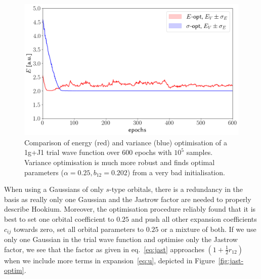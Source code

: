 \documentclass[final,3p,times,twocolumn]{elsarticle}
\begin{document}
	\afterpage{\FloatBarrier}
	\noindent
	\begin{figure}[h]
		\centering
		\includegraphics[width=\linewidth]{../plots/vmc-opt-1g.png}
		\caption{Comparison of energy (red) and variance (blue) optimisation of a 1g+J1 trial wave function over 600 epochs with $10^5$ samples. Variance optimisation is much more robust and finds optimal parameters ($\alpha = 0.25, b_{12} = 0.202$) from a very bad initialisation.}
		\label{fig:basic-optim}
	\end{figure}

	When using a Gaussians of only $s$-type orbitals, there is a redundancy in the basis as really only one Gaussian and the Jastrow factor are needed to properly describe Hookium. Moreover, the optimisation procedure reliably found that it is best to set one orbital coefficient to $0.25$ and push all other expansion coefficients $c_{ij}$ towards zero, set all orbital parameters to $0.25$ or a mixture of both. If we use only one Gaussian in the trial wave function and optimise only the Jastrow factor, we see that the factor as given in eq.~\eqref{eq:jast} approaches $(1 + \frac{1}{2}r_{12})$ when we include more terms in expansion~\eqref{eq:u}, depicted in Figure~\ref{fig:jast-optim}.
	
\end{document}

